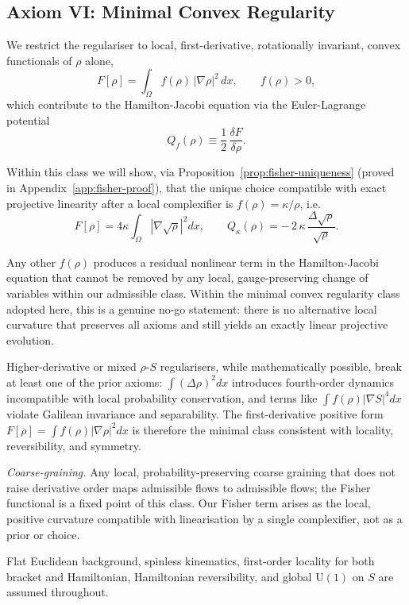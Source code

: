 \documentclass[11pt,a4paper]{article}
\numberwithin{equation}{section}
\theoremstyle{thmcompact}
\theoremstyle{remark}
\begin{document}
\subsection*{Axiom VI: Minimal Convex Regularity}\label{sec:fisher}
We restrict the regulariser to local, first-derivative, rotationally invariant, convex functionals of $\rho$ alone,
\[
F[\rho]=\int_{\Omega} f(\rho)\,|\nabla\rho|^{2}\,dx,\qquad f(\rho)>0,
\]
which contribute to the Hamilton-Jacobi equation via the Euler-Lagrange potential
\[
Q_{f}(\rho) \equiv \frac{1}{2}\,\frac{\delta F}{\delta \rho}.
\]

Within this class we will show, via Proposition~\ref{prop:fisher-uniqueness} (proved in Appendix~\ref{app:fisher-proof}), that the unique choice compatible with exact projective linearity after a local complexifier is $f(\rho)=\kappa/\rho$, i.e.
\[
F[\rho]=4\kappa\!\int_{\Omega}|\nabla\sqrt{\rho}|^{2}dx,\qquad
Q_{\kappa}(\rho)=-\,2\,\kappa\,\frac{\Delta\sqrt{\rho}}{\sqrt{\rho}}.
\]

Any other $f(\rho)$ produces a residual nonlinear term in the Hamilton-Jacobi equation that cannot be removed by any local, gauge-preserving change of variables within our admissible class. Within the minimal convex regularity class adopted here, this is a genuine no-go statement: there is no alternative local curvature that preserves all axioms and still yields an exactly linear projective evolution.

	Higher-derivative or mixed $\rho$-$S$ regularisers, while mathematically possible, break at least one of the prior axioms: $\int(\Delta\rho)^2dx$ introduces fourth-order dynamics incompatible with local probability conservation, and terms like $\int f(\rho)|\nabla S|^4dx$ violate Galilean invariance and separability. The first-derivative positive form $F[\rho]=\int f(\rho)|\nabla\rho|^2dx$ is therefore the minimal class consistent with locality, reversibility, and symmetry.
	
	\textit{Coarse-graining.} Any local, probability-preserving coarse graining that does not raise derivative order maps admissible flows to admissible flows; the Fisher functional is a fixed point of this class. Our Fisher term arises as the local, positive curvature compatible with linearisation by a single complexifier, not as a prior or choice.	
	
	Flat Euclidean background, spinless kinematics, first-order locality for both bracket and Hamiltonian, Hamiltonian reversibility, and global $\mathrm{U}(1)
$ on $S$ are assumed throughout.
	
\end{document}
